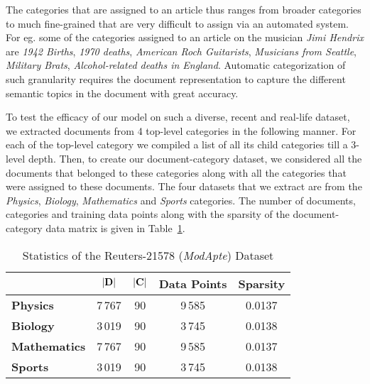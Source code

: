 The categories that are assigned to an article thus ranges from broader categories to much fine-grained that are very difficult to assign via an automated system. For eg. some of the categories assigned to an article on the musician \emph{Jimi Hendrix} are \emph{1942 Births}, \emph{1970 deaths}, \emph{American Roch Guitarists}, \emph{Musicians from Seattle}, \emph{Military Brats}, \emph{Alcohol-related deaths in England}. Automatic categorization of such granularity requires the document representation to capture the different semantic topics in the document with great accuracy.

To test the efficacy of our model on such a diverse, recent and real-life dataset, we extracted documents from 4 top-level categories in the following manner. For each of the top-level category we compiled a list of all its child categories till a 3-level depth. Then, to create our document-category dataset, we considered all the documents that belonged to these categories along with all the categories that were assigned to these documents. The four datasets that we extract are from the \emph{Physics}, \emph{Biology}, \emph{Mathematics} and \emph{Sports} categories. The number of documents, categories and training data points along with the sparsity of the document-category data matrix is given in Table~\ref{wiki:data:stat}.

\begin{table}[h!]
\begin{center}
\begin{tabular}{l c c c c} %
\toprule
& \textbf{$|\mathbf{D}|$} & \textbf{$|\mathbf{C}|$} & \textbf{Data Points} & \textbf{Sparsity}\\
\midrule
\textbf{Physics}		& 7\,767 & 90 & 9\,585 & 0.0137 \\
\textbf{Biology}		& 3\,019 & 90 & 3\,745 & 0.0138 \\
\textbf{Mathematics}	& 7\,767 & 90 & 9\,585 & 0.0137 \\
\textbf{Sports}			& 3\,019 & 90 & 3\,745 & 0.0138 \\
\bottomrule         
\end{tabular}
\caption{\label{wiki:data:stat}Statistics of the Reuters-21578 (\emph{ModApte}) Dataset}
\end{center}
\end{table}



